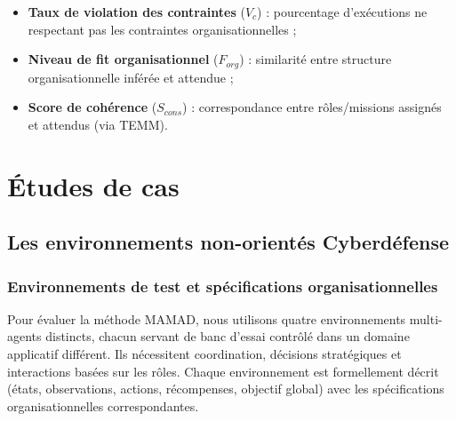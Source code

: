 \begin{itemize}
    \item \textbf{Taux de violation des contraintes} ($V_c$) : pourcentage d'exécutions ne respectant pas les contraintes organisationnelles ;
    \item \textbf{Niveau de fit organisationnel} ($F_{org}$) : similarité entre structure organisationnelle inférée et attendue ;
    \item \textbf{Score de cohérence} ($S_{cons}$) : correspondance entre rôles/missions assignés et attendus (via \ac{TEMM}).
\end{itemize}



\chapter{Études de cas}
\section{Les environnements non-orientés Cyberdéfense}

\subsection{Environnements de test et spécifications organisationnelles}

Pour évaluer la méthode \ac{MAMAD}, nous utilisons quatre environnements multi-agents distincts, chacun servant de banc d'essai contrôlé dans un domaine applicatif différent. Ils nécessitent coordination, décisions stratégiques et interactions basées sur les rôles. Chaque environnement est formellement décrit (états, observations, actions, récompenses, objectif global) avec les spécifications organisationnelles correspondantes.

